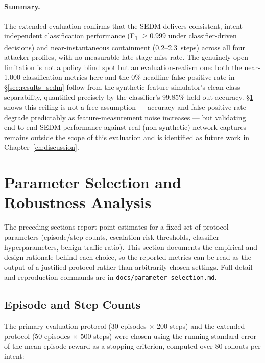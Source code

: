 \paragraph{Summary.}
The extended evaluation confirms that the SEDM delivers consistent,
intent-independent classification performance (F\textsubscript{1}
$\ge 0.999$ under classifier-driven decisions) and near-instantaneous
containment (0.2--2.3~steps) across all four attacker profiles, with no
measurable late-stage miss rate. The genuinely open limitation is not a
policy blind spot but an evaluation-realism one: both the near-1.000
classification metrics here and the 0\% headline false-positive rate in
\S\ref{sec:results_sedm} follow from the synthetic feature simulator's
clean class separability, quantified precisely by the classifier's 99.85\%
held-out accuracy. \S\ref{sec:results_params} shows this ceiling is not a
free assumption — accuracy and false-positive rate degrade predictably as
feature-measurement noise increases — but validating end-to-end SEDM
performance against real (non-synthetic) network captures remains outside
the scope of this evaluation and is identified as future work in
Chapter~\ref{ch:discussion}.

\section{Parameter Selection and Robustness Analysis}
\label{sec:results_params}

The preceding sections report point estimates for a fixed set of
protocol parameters (episode/step counts, escalation-risk thresholds,
classifier hyperparameters, benign-traffic ratio). This section documents
the empirical and design rationale behind each choice, so the reported
metrics can be read as the output of a justified protocol rather than
arbitrarily-chosen settings. Full detail and reproduction commands are in
\texttt{docs/parameter\_selection.md}.

\subsection{Episode and Step Counts}

The primary evaluation protocol (30 episodes $\times$ 200 steps) and the
extended protocol (50 episodes $\times$ 500 steps) were chosen using the
running standard error of the mean episode reward as a stopping criterion,
computed over 80 rollouts per intent:

